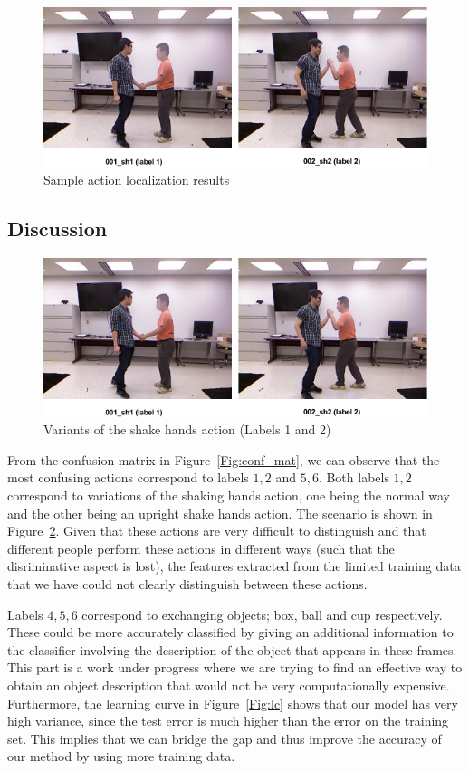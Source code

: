\documentclass[10pt,twocolumn,letterpaper]{article}
\begin{document}
\begin{figure}
\centering
\includegraphics[scale=0.3]{sh_conf.png}
\caption{Sample action localization results}
\label{Fig:act_loc_2}
\end{figure}


\subsection{Discussion}

\begin{figure}[ht]
\centering
\includegraphics[scale=0.3]{sh_conf.png}
\caption{Variants of the shake hands action (Labels 1 and 2)}
\label{Fig:sh_conf}
\end{figure}
From the confusion matrix in Figure~\ref{Fig:conf_mat}, we can observe that the most confusing actions correspond to labels ${1,2}$ and ${5,6}$. Both labels ${1,2}$ correspond  to variations of the shaking hands action, one being the normal way and the other being an upright shake hands action. The scenario is shown in Figure~\ref{Fig:sh_conf}. Given that these actions are very difficult to distinguish and that different people perform these actions in different ways (such that the disriminative aspect is lost), the features extracted from the limited training data that we have could not clearly distinguish between these actions. 

Labels ${4,5,6}$ correspond to exchanging objects; box, ball and cup respectively. These could be more accurately classified by giving an additional information to the classifier involving the description of the object that appears in these frames. This part is a work under progress where we are trying to find an effective way to obtain an object description that would not be very computationally expensive. 
Furthermore, the learning curve in Figure~\ref{Fig:lc} shows that our model has very high variance, since the test error is much higher than the error on the training set. This implies that we can bridge the gap and thus improve the accuracy of our method by using more training data. 
\end{document}
